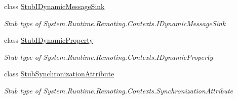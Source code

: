 \begin{DoxyCompactItemize}
class \hyperlink{class_system_1_1_runtime_1_1_remoting_1_1_contexts_1_1_fakes_1_1_stub_i_dynamic_message_sink}{Stub\-I\-Dynamic\-Message\-Sink}
\begin{DoxyCompactList}\small\item\em Stub type of System.\-Runtime.\-Remoting.\-Contexts.\-I\-Dynamic\-Message\-Sink\end{DoxyCompactList}\item 
class \hyperlink{class_system_1_1_runtime_1_1_remoting_1_1_contexts_1_1_fakes_1_1_stub_i_dynamic_property}{Stub\-I\-Dynamic\-Property}
\begin{DoxyCompactList}\small\item\em Stub type of System.\-Runtime.\-Remoting.\-Contexts.\-I\-Dynamic\-Property\end{DoxyCompactList}\item 
class \hyperlink{class_system_1_1_runtime_1_1_remoting_1_1_contexts_1_1_fakes_1_1_stub_synchronization_attribute}{Stub\-Synchronization\-Attribute}
\begin{DoxyCompactList}\small\item\em Stub type of System.\-Runtime.\-Remoting.\-Contexts.\-Synchronization\-Attribute\end{DoxyCompactList}\end{DoxyCompactItemize}
